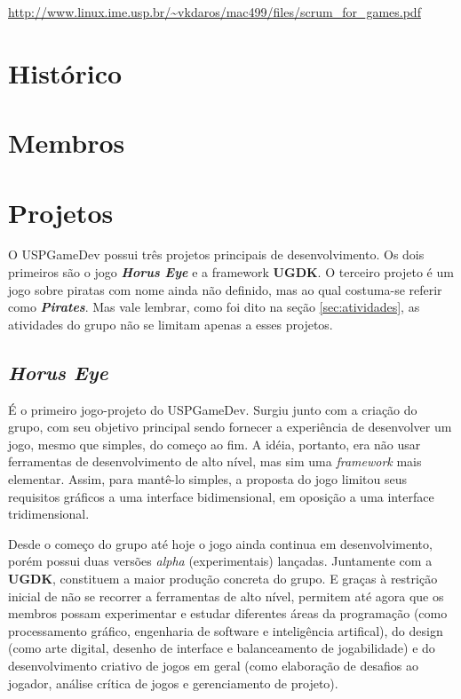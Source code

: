 \documentclass[12pt,onecolumn,a4paper]{article}
\begin{document}
        \begin{center}
            \footnotesize
            \url{http://www.linux.ime.usp.br/~vkdaros/mac499/files/scrum_for_games.pdf}
        \end{center}

\section{\LARGE Histórico}

\section{\LARGE Membros}

\section{\LARGE Projetos}
    O USPGameDev possui três projetos principais de desenvolvimento. Os dois primeiros são o jogo
    \textit{\textbf{Horus Eye}} e a framework \textbf{UGDK}. O terceiro projeto é um jogo sobre
    piratas com nome ainda não definido, mas ao qual costuma-se referir como
    \textit{\textbf{Pirates}}. Mas vale lembrar, como foi dito na seção \ref{sec:atividades}, as
    atividades do grupo não se limitam apenas a esses projetos.
    
    \subsection{\textit{Horus Eye}}
        É o primeiro jogo-projeto do USPGameDev. Surgiu junto com a criação do grupo, com seu
        objetivo principal sendo fornecer a experiência de desenvolver um jogo, mesmo que simples,
        do começo ao fim. A idéia, portanto, era não usar ferramentas de desenvolvimento de alto
        nível, mas sim uma \textit{framework} mais elementar. Assim, para mantê-lo simples, a
        proposta do jogo limitou seus requisitos gráficos a uma interface bidimensional, em oposição
        a uma interface tridimensional.
        
        Desde o começo do grupo até hoje o jogo ainda continua em desenvolvimento, porém possui duas
        versões \textit{alpha} (experimentais) lançadas. Juntamente com a \textbf{UGDK}, constituem
        a maior produção concreta do grupo. E graças à restrição inicial de não se recorrer a
        ferramentas de alto nível, permitem até agora que os membros possam experimentar e estudar
        diferentes áreas da programação (como processamento gráfico, engenharia de software e
        inteligência artifical), do design (como arte digital, desenho de interface e balanceamento
        de jogabilidade) e do desenvolvimento criativo de jogos em geral (como elaboração de
        desafios ao jogador, análise crítica de jogos e gerenciamento de projeto).
        
\end{document}
